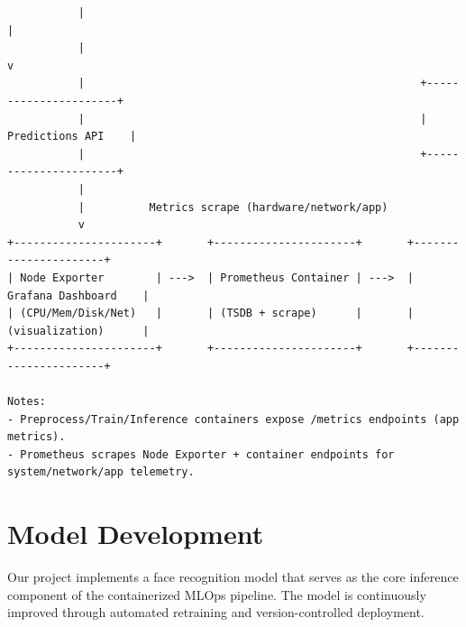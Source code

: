 \documentclass[10pt]{article}
\begin{document}
\begin{verbatim}
           |                                                               |
           |                                                               v
           |                                                    +----------------------+
           |                                                    |   Predictions API    |
           |                                                    +----------------------+
           |
           |          Metrics scrape (hardware/network/app)
           v
+----------------------+       +----------------------+       +----------------------+
| Node Exporter        | --->  | Prometheus Container | --->  | Grafana Dashboard    |
| (CPU/Mem/Disk/Net)   |       | (TSDB + scrape)      |       | (visualization)      |
+----------------------+       +----------------------+       +----------------------+

Notes:
- Preprocess/Train/Inference containers expose /metrics endpoints (app metrics).
- Prometheus scrapes Node Exporter + container endpoints for system/network/app telemetry.
\end{verbatim}
\newpage


\section*{Model Development}

Our project implements a face recognition model that serves as the core inference component of the containerized MLOps pipeline. The model is continuously improved through automated retraining and version-controlled deployment.
\end{document}
